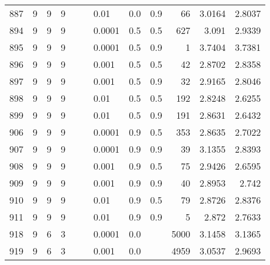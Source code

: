 \begin{longtable}{lrrrrrlrrrrr}
 887 &       9 & 9 & 9 &   &   &                        0.01 &  0.0 &    0.9 &      66 &                 3.0164 &                 2.8037 \\
 894 &       9 & 9 & 9 &   &   &                      0.0001 &  0.5 &    0.5 &     627 &                  3.091 &                 2.9339 \\
 895 &       9 & 9 & 9 &   &   &                      0.0001 &  0.5 &    0.9 &       1 &                 3.7404 &                 3.7381 \\
 896 &       9 & 9 & 9 &   &   &                       0.001 &  0.5 &    0.5 &      42 &                 2.8702 &                 2.8358 \\
 897 &       9 & 9 & 9 &   &   &                       0.001 &  0.5 &    0.9 &      32 &                 2.9165 &                 2.8046 \\
 898 &       9 & 9 & 9 &   &   &                        0.01 &  0.5 &    0.5 &     192 &                 2.8248 &                 2.6255 \\
 899 &       9 & 9 & 9 &   &   &                        0.01 &  0.5 &    0.9 &     191 &                 2.8631 &                 2.6432 \\
 906 &       9 & 9 & 9 &   &   &                      0.0001 &  0.9 &    0.5 &     353 &                 2.8635 &                 2.7022 \\
 907 &       9 & 9 & 9 &   &   &                      0.0001 &  0.9 &    0.9 &      39 &                 3.1355 &                 2.8393 \\
 908 &       9 & 9 & 9 &   &   &                       0.001 &  0.9 &    0.5 &      75 &                 2.9426 &                 2.6595 \\
 909 &       9 & 9 & 9 &   &   &                       0.001 &  0.9 &    0.9 &      40 &                 2.8953 &                  2.742 \\
 910 &       9 & 9 & 9 &   &   &                        0.01 &  0.9 &    0.5 &      79 &                 2.8726 &                 2.8376 \\
 911 &       9 & 9 & 9 &   &   &                        0.01 &  0.9 &    0.9 &       5 &                  2.872 &                 2.7633 \\
 918 &       9 & 6 & 3 &   &   &                      0.0001 &  0.0 &        &    5000 &                 3.1458 &                 3.1365 \\
 919 &       9 & 6 & 3 &   &   &                       0.001 &  0.0 &        &    4959 &                 3.0537 &                 2.9693 \\

\end{longtable}
